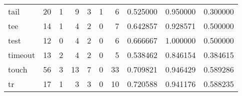 \begin{longtable}{lrrrrrrrrr}
tail      &                                      20 &                                                  1 &                                                  9 &                                                  3 &                                                  1 &                                                  6 &                                           0.525000 &                               0.950000 &                             0.300000 \\
tee       &                                      14 &                                                  1 &                                                  4 &                                                  2 &                                                  0 &                                                  7 &                                           0.642857 &                               0.928571 &                             0.500000 \\
test      &                                      12 &                                                  0 &                                                  4 &                                                  2 &                                                  0 &                                                  6 &                                           0.666667 &                               1.000000 &                             0.500000 \\
timeout   &                                      13 &                                                  2 &                                                  4 &                                                  2 &                                                  0 &                                                  5 &                                           0.538462 &                               0.846154 &                             0.384615 \\
touch     &                                      56 &                                                  3 &                                                 13 &                                                  7 &                                                  0 &                                                 33 &                                           0.709821 &                               0.946429 &                             0.589286 \\
tr        &                                      17 &                                                  1 &                                                  3 &                                                  3 &                                                  0 &                                                 10 &                                           0.720588 &                               0.941176 &                             0.588235 \\

\end{longtable}
